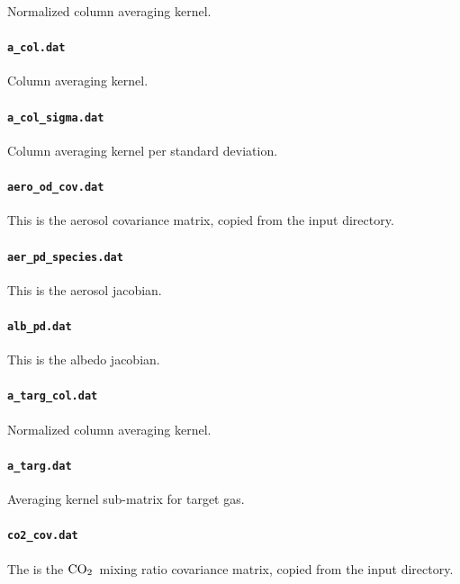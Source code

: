 \documentclass{article}
\newcommand{\COtwo}{\ensuremath{\rm{CO}_2}}
\begin{document}
Normalized column averaging kernel.

\paragraph{\texttt{a\_col.dat}}

Column averaging kernel.

\paragraph{\texttt{a\_col\_sigma.dat}}

Column averaging kernel per standard deviation.

\paragraph{\texttt{aero\_od\_cov.dat}}

This is the aerosol covariance matrix, copied from the input
directory. 

\paragraph{\texttt{aer\_pd\_species.dat}}

This is the aerosol jacobian.

\paragraph{\texttt{alb\_pd.dat}}

This is the albedo jacobian.

\paragraph{\texttt{a\_targ\_col.dat}}

Normalized column averaging kernel.

\paragraph{\texttt{a\_targ.dat}}

Averaging kernel sub-matrix for target gas.

\paragraph{\texttt{co2\_cov.dat}}

The is the \COtwo\ mixing ratio covariance matrix, copied from the
input directory.
\end{document}

